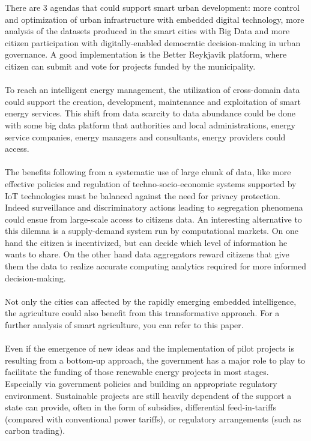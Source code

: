 \documentclass[11pt]{article}
\begin{document}
There are 3 agendas that could support smart urban development: more control and optimization of urban infrastructure with embedded digital technology, more analysis of the datasets produced in the smart cities with Big Data and more citizen participation with digitally-enabled democratic decision-making in urban governance. A good implementation is the Better Reykjavik platform, where citizen can submit and vote for projects funded by the municipality.\cite{14}\\\\
To reach an intelligent energy management, the utilization of cross-domain data could support the creation, development, maintenance and exploitation of smart energy services. This shift from data scarcity to data abundance could be done with some big data platform that authorities and local administrations, energy service companies, energy managers and consultants, energy providers could access.\cite{17}\cite{19}\\\\
The benefits following from a systematic use of large chunk of data, like more effective policies and regulation of techno-socio-economic systems supported by IoT technologies must be balanced against the need for privacy protection. Indeed surveillance and discriminatory actions leading to segregation phenomena could ensue from large-scale access to citizens data. An interesting alternative to this dilemna is a supply-demand system run by computational markets. On one hand the citizen is incentivized, but can decide which level of information he wants to share. On the other hand data aggregators reward citizens that give them the data to realize accurate computing analytics required for more informed decision-making.\cite{18}\\\\
Not only the cities can affected by the rapidly emerging embedded intelligence, the agriculture could also benefit from this transformative approach. For a further analysis of smart agriculture, you can refer to this paper\cite{16}.\\\\
Even if the emergence of new ideas and the implementation of pilot projects is resulting from a bottom-up approach, the government has a major role to play to facilitate the funding of those renewable energy projects in most stages. Especially via government policies and building an appropriate regulatory environment. Sustainable projects are still heavily dependent of the support a state can provide, often in the form of subsidies, differential feed-in-tariffs (compared with conventional power tariffs), or regulatory arrangements (such as carbon trading).\cite{22}\\
\end{document}
